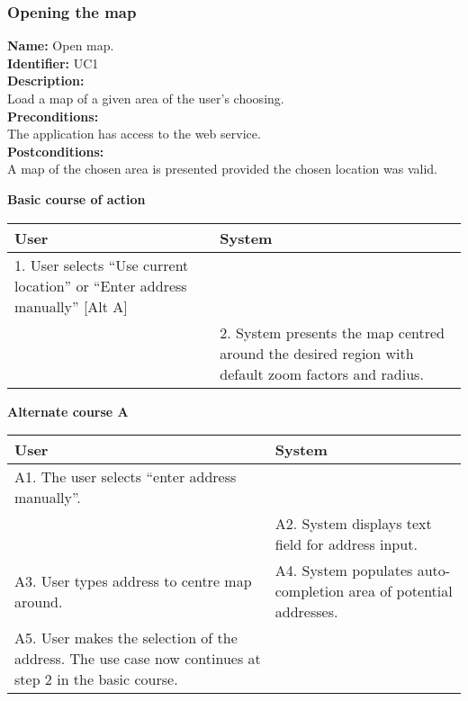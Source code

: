 \documentclass[11pt,twoside,a4paper]{article}
\begin{document}
\subsubsection{Opening the map}
\textbf{Name:} Open map.\\
\textbf{Identifier:} UC1\\
\textbf{Description:}\\
Load a map of a given area of the user's choosing.\\
\textbf{Preconditions:}\\
The application has access to the web service.\\
\textbf{Postconditions:}\\
A map of the chosen area is presented provided the chosen location was
valid.

\noindent
\textbf{Basic course of action}\\
\begin{tabularx}{\textwidth}{ |X|X|}
  \hline
  \textbf{User} & \textbf{System}\\
  \hline
  1. User selects ``Use current location'' or ``Enter address manually''
  [Alt A] & \\
  \hline
  & 2. System presents the map centred around the desired region with
  default zoom factors and radius.\\
  \hline
\end{tabularx}

\noindent 
\textbf{Alternate course A}\\
\begin{tabularx}{\textwidth}{ |X|X| }
  \hline
  \textbf{User} & \textbf{System}\\
  \hline
  A1. The user selects ``enter address manually''. & \\
  \hline
  & A2. System displays text field for address input.\\
  \hline
  A3. User types address to centre map around. & A4. System populates
  auto-completion area of potential addresses.\\
  \hline
  A5. User makes the selection of the address. The use case now
  continues at step 2 in the basic course. & \\
  \hline
\end{tabularx}
\end{document}

